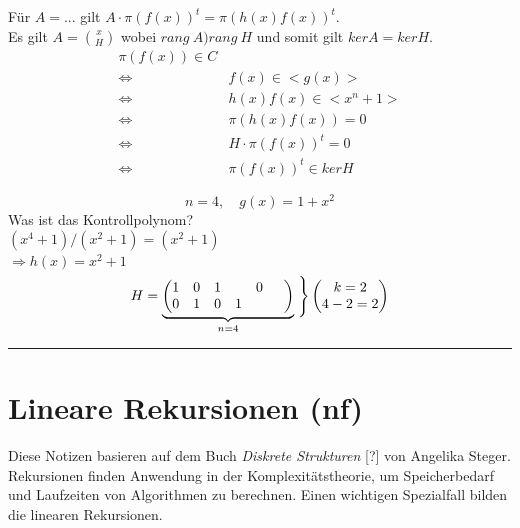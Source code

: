 \documentclass[9pt]{article}
\begin{document}
Für $A = ...$ gilt $A \cdot \pi(f(x))^t = \pi(h(x)f(x))^t$. \\
Es gilt $A = \binom{x}{H}$ wobei $rang \ A ) rang \ H$ und somit gilt $kerA = kerH$.  
\begin{align*}
    \pi(f(x)) \in C & \\
    \Leftrightarrow & f(x) \in <g(x)> \\
    \Leftrightarrow & h(x)f(x) \in <x^n+1> \\
 \Leftrightarrow & \pi(h(x)f(x)) = 0 \\
  \Leftrightarrow & H \cdot \pi(f(x))^t = 0 \\
   \Leftrightarrow & \pi(f(x))^t \in kerH
\end{align*}

\begin{bsp}
\[ n=4, \quad g(x)=1+x^2\]
Was ist das Kontrollpolynom? \\
$(x^4+1) / (x^2+1) =  (x^2+1) $ \\
$\Rightarrow h(x) = x^2+1$ \\
\[
H = \underbrace{\begin{pmatrix}
1 & 0 & 1 & 0 \\
0 & 1 & 0 & 1 \hspace*{3em}
\end{pmatrix}}_{n=4}
 \smash{\left.\begin{array}{@{}c@{}}\\[\jot]\\[\jot]\end{array}\right\}} \\[\jot] 
 \begin{pmatrix}
k = 2\\
4-2=2
\end{pmatrix}
\]
\end{bsp} \noindent \rule{8cm}{0.4pt}

\section{Lineare Rekursionen (nf)}

Diese Notizen basieren auf dem Buch \textit{Diskrete Strukturen} [?] von Angelika Steger. Rekursionen finden Anwendung in der Komplexitätstheorie, um Speicherbedarf und Laufzeiten von Algorithmen zu berechnen. Einen wichtigen Spezialfall bilden die linearen Rekursionen.
\end{document}
